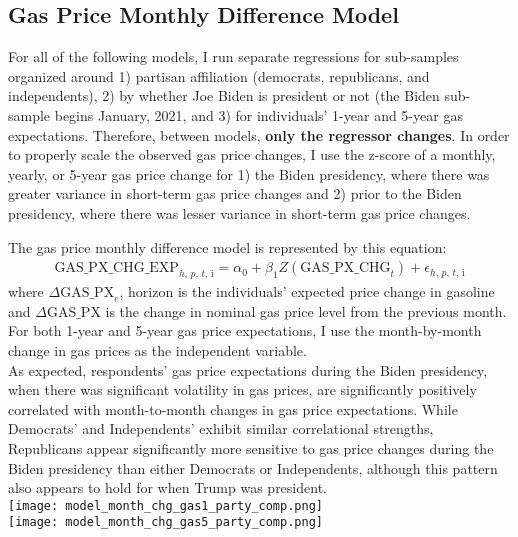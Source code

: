 \documentclass{article}
\begin{document}
\raggedright \subsection{Gas Price Monthly Difference Model}

\noindent For all of the following models, I run separate regressions for sub-samples organized around 1) partisan affiliation (democrats, republicans, and independents), 2) by whether Joe Biden is president or not (the Biden sub-sample begins January, 2021, and 3) for individuals' 1-year and 5-year gas expectations. Therefore, between models, \textbf{only the regressor changes}. In order to properly scale the observed gas price changes, I use the z-score of a monthly, yearly, or 5-year gas price change for 1) the Biden presidency, where there was greater variance in short-term gas price changes and 2) prior to the Biden presidency, where there was lesser variance in short-term gas price changes. 

The gas price monthly difference model is represented by this equation:
\begin{gather}
	 \text{GAS\_PX\_CHG\_EXP}_{h\text{, }p\text{, }t\text{, i}} = \alpha_0 + \beta_1 Z(\text{GAS\_PX\_CHG}_t) + \epsilon_{h\text{, }p\text{, }t\text{, i}}
\end{gather}
where $\Delta \text{GAS\_PX}_e\text{, horizon}$ is the individuals' expected price change in gasoline and $\Delta \text{GAS\_PX}$ is the change in nominal gas price level from the previous month. For both 1-year and 5-year gas price expectations, I use the month-by-month change in gas prices as the independent variable. \\
\vspace{0.1in}
As expected, respondents' gas price expectations during the Biden presidency, when there was significant volatility in gas prices, are significantly positively correlated with month-to-month changes in gas price expectations. While Democrats' and Independents' exhibit similar correlational strengths, Republicans appear significantly more sensitive to gas price changes during the Biden presidency than either Democrats or Independents, although this pattern also appears to hold for when Trump was president. \\
\vspace{0.1in}
\centering \texttt{[image: model\_month\_chg\_gas1\_party\_comp.png]} \\
\texttt{[image: model\_month\_chg\_gas5\_party\_comp.png]} 
\end{document}
